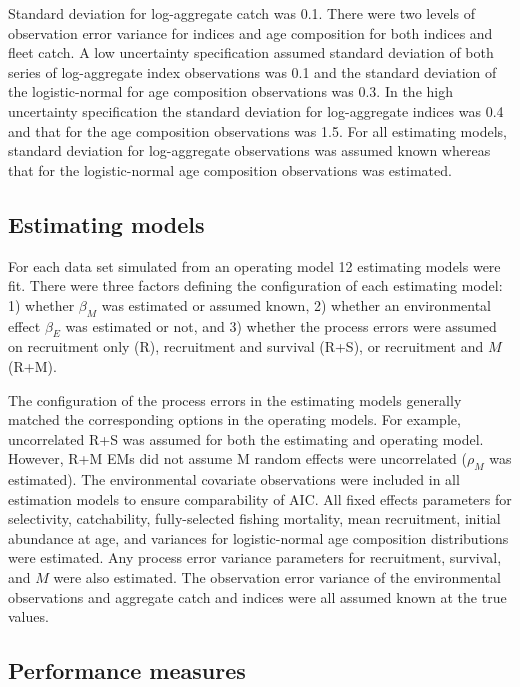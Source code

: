 \documentclass[
  12pt,
]{article}
\begin{document}
Standard deviation for log-aggregate catch was 0.1. There were two levels of observation error variance for indices and age composition for both indices and fleet catch. A low uncertainty specification assumed standard deviation of both series of log-aggregate index observations was 0.1 and the standard deviation of the logistic-normal for age composition observations was 0.3. In the high uncertainty specification the standard deviation for log-aggregate indices was 0.4 and that for the age composition observations was 1.5. For all estimating models, standard deviation for log-aggregate observations was assumed known whereas that for the logistic-normal age composition observations was estimated.

\hypertarget{estimating-models}{%
\subsection*{Estimating models}\label{estimating-models}}

For each data set simulated from an operating model 12 estimating models were fit. There were three factors defining the configuration of each estimating model: 1) whether \(\beta_M\) was estimated or assumed known, 2) whether an environmental effect \(\beta_E\) was estimated or not, and 3) whether the process errors were assumed on recruitment only (R), recruitment and survival (R+S), or recruitment and \(M\) (R+M).

The configuration of the process errors in the estimating models generally matched the corresponding options in the operating models. For example, uncorrelated R+S was assumed for both the estimating and operating model. However, R+M EMs did not assume M random effects were uncorrelated (\(\rho_M\) was estimated). The environmental covariate observations were included in all estimation models to ensure comparability of AIC. All fixed effects parameters for selectivity, catchability, fully-selected fishing mortality, mean recruitment, initial abundance at age, and variances for logistic-normal age composition distributions were estimated. Any process error variance parameters for recruitment, survival, and \(M\) were also estimated. The observation error variance of the environmental observations and aggregate catch and indices were all assumed known at the true values.

\hypertarget{performance-measures}{%
\subsection*{Performance measures}\label{performance-measures}}
\end{document}
